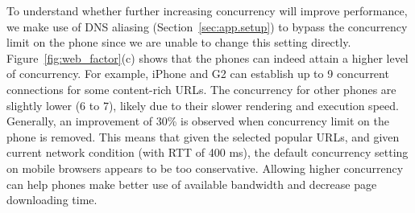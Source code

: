 To understand whether further increasing concurrency will improve 
performance, we make use of DNS aliasing 
(Section~\ref{sec:app.setup}) to bypass the concurrency limit on 
the phone since we are unable to change this setting directly.
Figure~\ref{fig:web_factor}(c) shows that the phones can indeed
attain a higher level of concurrency. For example, iPhone and G2 
can establish up to 9 concurrent connections for some content-rich 
URLs. The concurrency for other phones are slightly lower (6 to 7), 
likely due to their slower rendering and execution speed.
Generally, an improvement of 30\% is observed when concurrency limit
on the phone is removed.
This means that given the selected popular URLs, and given 
current network condition (with RTT of 400 ms), the default
concurrency setting on mobile browsers appears to be too
conservative. Allowing higher concurrency can help phones
make better use of available bandwidth and decrease page downloading time.



